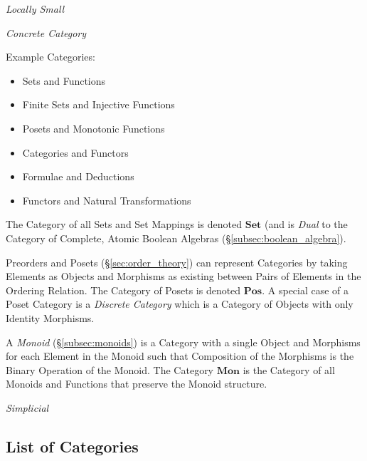 \emph{Locally Small}

\emph{Concrete Category}

Example Categories:
\begin{itemize}
\item Sets and Functions
\item Finite Sets and Injective Functions
\item Posets and Monotonic Functions
\item Categories and Functors
\item Formulae and Deductions
\item Functors and Natural Transformations
\end{itemize}
The Category of all Sets and Set Mappings is denoted $\mathbf{Set}$
(and is \emph{Dual} to the Category of Complete, Atomic Boolean
Algebras (\S\ref{subsec:boolean_algebra}).

Preorders and Posets (\S\ref{sec:order_theory}) can represent
Categories by taking Elements as Objects and Morphisms as existing
between Pairs of Elements in the Ordering Relation. The Category of
Posets is denoted $\mathbf{Pos}$. A special case of a Poset Category
is a \emph{Discrete Category} which is a Category of Objects with only
Identity Morphisms.

A \emph{Monoid} (\S\ref{subsec:monoids}) is a Category with a single
Object and Morphisms for each Element in the Monoid such that
Composition of the Morphisms is the Binary Operation of the
Monoid. The Category $\mathbf{Mon}$ is the Category of all Monoids and
Functions that preserve the Monoid structure.

\emph{Simplicial}

\subsection{List of Categories}\label{subsec:categories_list}

